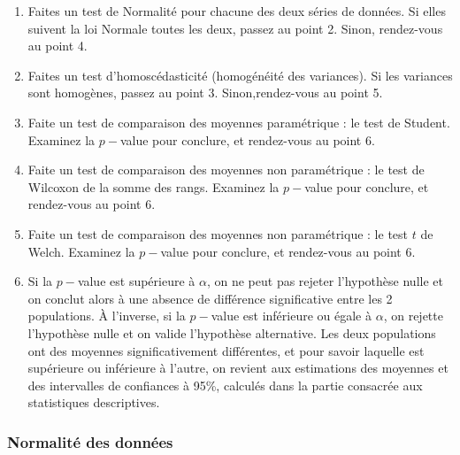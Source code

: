 \documentclass[
  french,
  a4paper,
  DIV=11,
  numbers=noendperiod,
  oneside]{scrreprt}
\providecommand{\tightlist}{%
  \setlength{\itemsep}{0pt}\setlength{\parskip}{0pt}}
\begin{document}
\begin{tcolorbox}[enhanced jigsaw, arc=.35mm, bottomrule=.15mm, bottomtitle=1mm, breakable, colback=white, colbacktitle=quarto-callout-warning-color!10!white, colframe=quarto-callout-warning-color-frame, coltitle=black, left=2mm, leftrule=.75mm, opacityback=0, opacitybacktitle=0.6, rightrule=.15mm, title=\textcolor{quarto-callout-warning-color}{\faExclamationTriangle}\hspace{0.5em}{La procédure à suivre}, titlerule=0mm, toprule=.15mm, toptitle=1mm]

\begin{enumerate}
\def\labelenumi{\arabic{enumi}.}
\tightlist
\item
  Faites un test de Normalité pour chacune des deux séries de données.
  Si elles suivent la loi Normale toutes les deux, passez au point 2.
  Sinon, rendez-vous au point 4.
\item
  Faites un test d'homoscédasticité (homogénéité des variances). Si les
  variances sont homogènes, passez au point 3. Sinon,rendez-vous au
  point 5.
\item
  Faite un test de comparaison des moyennes paramétrique : le test de
  Student. Examinez la \(p-\)value pour conclure, et rendez-vous au
  point 6.
\item
  Faite un test de comparaison des moyennes non paramétrique : le test
  de Wilcoxon de la somme des rangs. Examinez la \(p-\)value pour
  conclure, et rendez-vous au point 6.
\item
  Faite un test de comparaison des moyennes non paramétrique : le test
  \(t\) de Welch. Examinez la \(p-\)value pour conclure, et rendez-vous
  au point 6.
\item
  Si la \(p-\)value est supérieure à \(\alpha\), on ne peut pas rejeter
  l'hypothèse nulle et on conclut alors à une absence de différence
  significative entre les 2 populations. À l'inverse, si la \(p-\)value
  est inférieure ou égale à \(\alpha\), on rejette l'hypothèse nulle et
  on valide l'hypothèse alternative. Les deux populations ont des
  moyennes significativement différentes, et pour savoir laquelle est
  supérieure ou inférieure à l'autre, on revient aux estimations des
  moyennes et des intervalles de confiances à 95\%, calculés dans la
  partie consacrée aux statistiques descriptives.
\end{enumerate}

\end{tcolorbox}

\subsubsection{Normalité des données}\label{normalituxe9-des-donnuxe9es}
\end{document}
